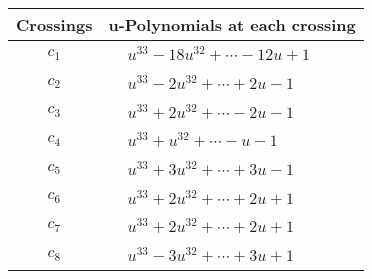 \documentclass[1p]{elsarticle_modified}
\theoremstyle{definition}
\begin{document}
\begin{tabular}{m{50pt}|m{274pt}}
Crossings & \hspace{64pt}u-Polynomials at each crossing \\
\hline $$\begin{aligned}c_{1}\end{aligned}$$&$\begin{aligned}
&u^{33}-18 u^{32}+\cdots-12 u+1
\end{aligned}$\\
\hline $$\begin{aligned}c_{2}\end{aligned}$$&$\begin{aligned}
&u^{33}-2 u^{32}+\cdots+2 u-1
\end{aligned}$\\
\hline $$\begin{aligned}c_{3}\end{aligned}$$&$\begin{aligned}
&u^{33}+2 u^{32}+\cdots-2 u-1
\end{aligned}$\\
\hline $$\begin{aligned}c_{4}\end{aligned}$$&$\begin{aligned}
&u^{33}+u^{32}+\cdots- u-1
\end{aligned}$\\
\hline $$\begin{aligned}c_{5}\end{aligned}$$&$\begin{aligned}
&u^{33}+3 u^{32}+\cdots+3 u-1
\end{aligned}$\\
\hline $$\begin{aligned}c_{6}\end{aligned}$$&$\begin{aligned}
&u^{33}+2 u^{32}+\cdots+2 u+1
\end{aligned}$\\
\hline $$\begin{aligned}c_{7}\end{aligned}$$&$\begin{aligned}
&u^{33}+2 u^{32}+\cdots+2 u+1
\end{aligned}$\\
\hline $$\begin{aligned}c_{8}\end{aligned}$$&$\begin{aligned}
&u^{33}-3 u^{32}+\cdots+3 u+1
\end{aligned}$\\

\end{tabular}
\end{document}
